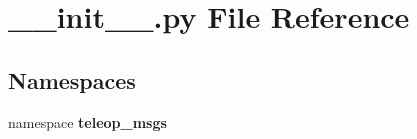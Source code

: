 \section{\_\-\_\-init\_\-\_\-.py File Reference}
\label{____init_____8py}
\subsection*{Namespaces}
\begin{DoxyCompactItemize}
\item 
namespace {\bf teleop\_\-msgs}
\end{DoxyCompactItemize}

